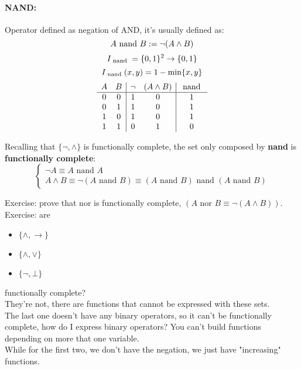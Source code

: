 	\paragraph{NAND:} Operator defined as negation of AND, it's usually defined as:
	$$ A \text{ nand } B := \neg (A \wedge B) $$
	$$ I_{\text{ nand }} = \{0,1\}^2 \rightarrow \{0,1\} $$
	$$ I_{\text{ nand }} (x,y) = 1 - \min\{x,y\}$$
	$$
	\begin{array}{c c | c c | c}
		A & B & \neg & (A \wedge B) & \text{ nand } \\
		\hline
		0 & 0 & 1 & 0 & 1 \\
		0 & 1 & 1 & 0 & 1 \\
		1 & 0 & 1 & 0 & 1 \\
		1 & 1 & 0 & 1 & 0 \\
	\end{array}
	$$


	Recalling that $\{\neg, \wedge\}$ is functionally complete, the set only composed by \textbf{nand} is \textbf{functionally complete}:
	$$
	\begin{cases}
		\neg A \equiv A \text{ nand } A \\
		A \wedge B \equiv \neg (A \text{ nand } B) \equiv (A \text{ nand } B) \text{ nand } (A \text{ nand } B)
	\end{cases}
	$$

	\newpage

	Exercise: prove that nor is functionally complete, $(A \text{ nor } B \equiv \neg (A \wedge B))$.\\

	Exercise: are
	\begin{itemize}
		\item $\{\wedge, \rightarrow\}$
		\item $\{\wedge, \vee\}$
		\item $\{\neg, \bot\}$
	\end{itemize}

	functionally complete? \\

	They're not, there are functions that cannot be expressed with these sets.\\

	The last one doesn't have any binary operators, so it can't be functionally complete, how do I express binary operators? You can't build functions depending on more that one variable.\\

	While for the first two, we don't have the negation, we just have "increasing" functions.\\

